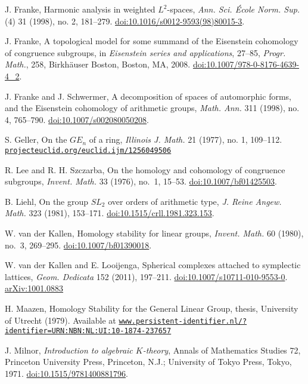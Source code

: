 \documentclass[11 pt]{article}
\theoremstyle{plain}
\theoremstyle{definition}
\numberwithin{equation}{section}
\newcommand{\arXiv}[1]{\href{http://arxiv.org/abs/#1}{arXiv:#1}}
\newcommand{\doi}[1]{\href{http://dx.doi.org/#1}{doi:#1}}
\newcommand{\change}{}
\begin{document}
\begin{thebibliography}{vdKL}
\begin{footnotesize}
 J. Franke, Harmonic analysis in weighted $L^2$-spaces, \emph{Ann. Sci. \'Ecole Norm. Sup.} (4)  31  (1998),  no. 2, 181--279. \doi{10.1016/s0012-9593(98)80015-3}.

 J. Franke, A topological model for some summand of the Eisenstein cohomology of
 congruence subgroups,
in \emph{Eisenstein series and applications}, 
 27--85, \emph{Progr. Math.}, 258, Birkh\"auser Boston, Boston, MA,  2008. \doi{10.1007/978-0-8176-4639-4_2}.

 J. Franke and J. Schwermer, A decomposition of spaces of automorphic forms, and the Eisenstein
 cohomology of arithmetic groups,
 \emph{Math. Ann.}  311  (1998),  no. 4, 765--790. \doi{10.1007/s002080050208}.

S. Geller, On the $GE_n$ of a ring,
 \emph{Illinois J. Math.}  21  (1977),  no. 1, 109--112. \newline \href{http://projecteuclid.org/euclid.ijm/1256049506}{\nolinkurl{projecteuclid.org/euclid.ijm/1256049506}}

R. Lee and R. H. Szczarba, On the homology and cohomology of congruence subgroups, \emph{Invent. Math.} 33 (1976), no.~1, 15--53. \doi{10.1007/bf01425503}.

B. Liehl, On the group $SL_2$ over orders of arithmetic type,
 \emph{J. Reine Angew. Math.}  323  (1981), 153--171. \doi{10.1515/crll.1981.323.153}.
 
W. van der Kallen, Homology stability for linear groups, \emph{Invent. Math.} 60 (1980), no.~3, 269--295. \doi{10.1007/bf01390018}.

W. van der Kallen and E. Looijenga, Spherical complexes attached to symplectic lattices, \emph{Geom. Dedicata} 152 (2011), 197--211. \doi{10.1007/s10711-010-9553-0}. \arXiv{1001.0883}

H. Maazen, Homology Stability for the General Linear Group, thesis, University of Utrecht (1979). Available at \href{http://www.persistent-identifier.nl/?identifier=URN:NBN:NL:UI:10-1874-237657}{\nolinkurl{www.persistent-identifier.nl/?identifier=URN:NBN:NL:UI:10-1874-237657}}
\change

J. Milnor,  \emph{Introduction to algebraic $K$-theory},
Annals of Mathematics Studies  72,
Princeton University Press, Princeton, N.J.; University of Tokyo Press,
 Tokyo,  1971. \doi{10.1515/9781400881796}.


\end{footnotesize}
\end{thebibliography}
\end{document}
